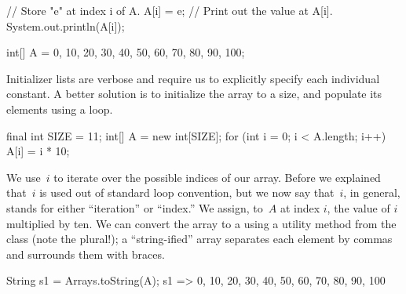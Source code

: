 \begin{verbnobox}[\small]
// Store "e" at index i of A.
A[i] = e;
// Print out the value at A[i].
System.out.println(A[i]);
\end{verbnobox}

\begin{verbnobox}[\small]
int[] A = {0, 10, 20, 30, 40, 50, 60, 70, 80, 90, 100};
\end{verbnobox}

Initializer lists are verbose and require us to explicitly specify each individual constant. 
A better solution is to initialize the array to a size, and populate its elements using a loop.

\begin{verbnobox}[\small]
final int SIZE = 11;
int[] A = new int[SIZE];
for (int i = 0; i < A.length; i++) { A[i] = i * 10; }
\end{verbnobox}

We use~$i$ to iterate over the possible indices of our array. 
Before we explained that~$i$ is used out of standard loop convention, but we now say that~$i$, in general, stands for either ``iteration'' or ``index.'' 
We assign, to~$A$ at index $i$, the value of $i$ multiplied by ten. 
We can convert the array to a  using a utility method from the  class (note the plural!); a ``string-ified'' array separates each element by commas and surrounds them with braces.

\begin{verbnobox}[\small]
String s1 = Arrays.toString(A);
s1 => {0, 10, 20, 30, 40, 50, 60, 70, 80, 90, 100}
\end{verbnobox}

